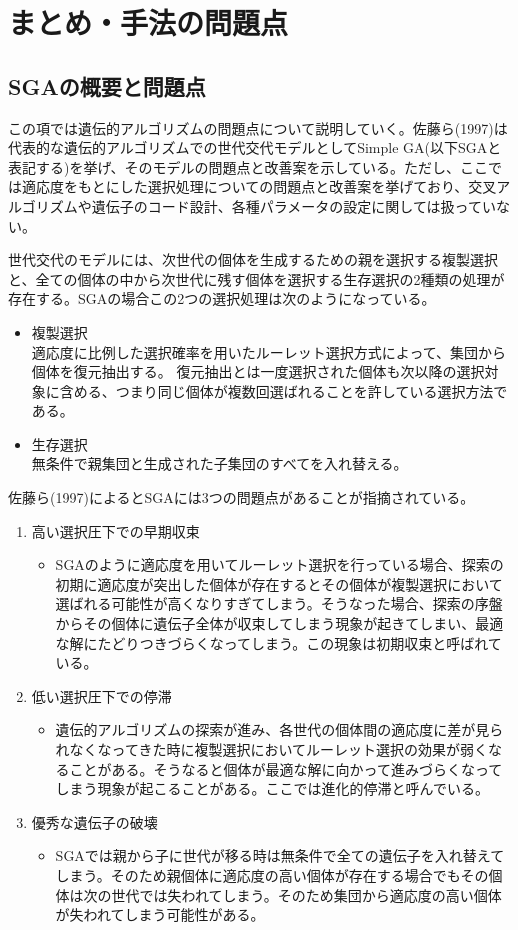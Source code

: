 \section{まとめ・手法の問題点
}
\subsection{SGAの概要と問題点}
この項では遺伝的アルゴリズムの問題点について説明していく。佐藤ら(1997)は代表的な遺伝的アルゴリズムでの世代交代モデルとしてSimple GA(以下SGAと表記する)を挙げ、そのモデルの問題点と改善案を示している。ただし、ここでは適応度をもとにした選択処理についての問題点と改善案を挙げており、交叉アルゴリズムや遺伝子のコード設計、各種パラメータの設定に関しては扱っていない。

世代交代のモデルには、次世代の個体を生成するための親を選択する複製選択と、全ての個体の中から次世代に残す個体を選択する生存選択の2種類の処理が存在する。SGAの場合この2つの選択処理は次のようになっている。

\begin{itemize}
\item{複製選択}\\
適応度に比例した選択確率を用いたルーレット選択方式によって、集団から個体を復元抽出する。
復元抽出とは一度選択された個体も次以降の選択対象に含める、つまり同じ個体が複数回選ばれることを許している選択方法である。
\item{生存選択}\\
無条件で親集団と生成された子集団のすべてを入れ替える。
\end{itemize}

佐藤ら(1997)によるとSGAには3つの問題点があることが指摘されている。
\begin{enumerate}
\item{高い選択圧下での早期収束}
\begin{itemize}
\item{SGAのように適応度を用いてルーレット選択を行っている場合、探索の初期に適応度が突出した個体が存在するとその個体が複製選択において選ばれる可能性が高くなりすぎてしまう。そうなった場合、探索の序盤からその個体に遺伝子全体が収束してしまう現象が起きてしまい、最適な解にたどりつきづらくなってしまう。この現象は初期収束と呼ばれている。}
\end{itemize}
\item{低い選択圧下での停滞}
\begin{itemize}
\item{遺伝的アルゴリズムの探索が進み、各世代の個体間の適応度に差が見られなくなってきた時に複製選択においてルーレット選択の効果が弱くなることがある。そうなると個体が最適な解に向かって進みづらくなってしまう現象が起こることがある。ここでは進化的停滞と呼んでいる。}
\end{itemize}
\item{優秀な遺伝子の破壊}
\begin{itemize}
\item{SGAでは親から子に世代が移る時は無条件で全ての遺伝子を入れ替えてしまう。そのため親個体に適応度の高い個体が存在する場合でもその個体は次の世代では失われてしまう。そのため集団から適応度の高い個体が失われてしまう可能性がある。}
\end{itemize}
\end{enumerate}

